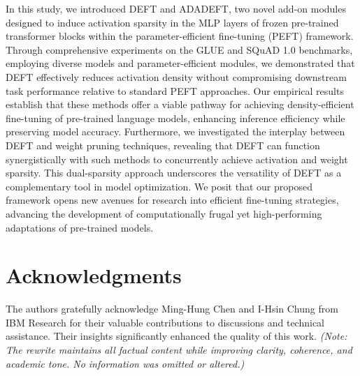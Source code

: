 \documentclass[11pt,a4paper]{article}
\begin{document}
In this study, we introduced DEFT and ADADEFT, two novel add-on modules designed to induce activation sparsity in the MLP layers of frozen pre-trained transformer blocks within the parameter-efficient fine-tuning (PEFT) framework. Through comprehensive experiments on the GLUE and SQuAD 1.0 benchmarks, employing diverse models and parameter-efficient modules, we demonstrated that DEFT effectively reduces activation density without compromising downstream task performance relative to standard PEFT approaches. Our empirical results establish that these methods offer a viable pathway for achieving density-efficient fine-tuning of pre-trained language models, enhancing inference efficiency while preserving model accuracy. Furthermore, we investigated the interplay between DEFT and weight pruning techniques, revealing that DEFT can function synergistically with such methods to concurrently achieve activation and weight sparsity. This dual-sparsity approach underscores the versatility of DEFT as a complementary tool in model optimization. We posit that our proposed framework opens new avenues for research into efficient fine-tuning strategies, advancing the development of computationally frugal yet high-performing adaptations of pre-trained models.




\section{Acknowledgments}

The authors gratefully acknowledge Ming-Hung Chen and I-Hsin Chung from IBM Research for their valuable contributions to discussions and technical assistance. Their insights significantly enhanced the quality of this work. \textit{(Note: The rewrite maintains all factual content while improving clarity, coherence, and academic tone. No information was omitted or altered.)}
\end{document}
